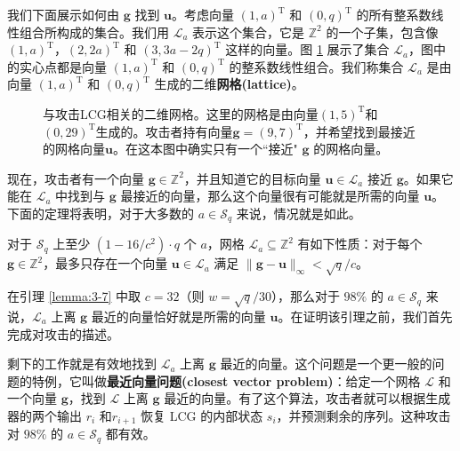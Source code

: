 \begin{snote}[密码分析。]
我们下面展示如何由 $\boldsymbol{g}$ 找到 $\boldsymbol{u}$。考虑向量 $(1,a)^\mathrm{T}$ 和 $(0,q)^\mathrm{T}$ 的所有整系数线性组合所构成的集合。我们用 $\mathcal{L}_a$ 表示这个集合，它是 $\mathbb{Z}^2$ 的一个子集，包含像 $(1,a)^\mathrm{T}$，$(2,2a)^\mathrm{T}$ 和 $(3,3a-2q)^\mathrm{T}$ 这样的向量。图 \ref{fig:3-9} 展示了集合 $\mathcal{L}_a$，图中的实心点都是向量 $(1,a)^\mathrm{T}$ 和 $(0,q)^\mathrm{T}$ 的整系数线性组合。我们称集合 $\mathcal{L}_a$ 是由向量 $(1,a)^\mathrm{T}$ 和 $(0,q)^\mathrm{T}$ 生成的二维\textbf{网格(lattice)}。

\begin{figure}
	\centering
	
	\caption{与攻击LCG相关的二维网格。这里的网格是由向量$(1,5)^\mathrm{T}$和$(0,29)^\mathrm{T}$生成的。攻击者持有向量$\boldsymbol{g}=(9,7)^\mathrm{T}$，并希望找到最接近的网格向量$\boldsymbol{u}$。在这本图中确实只有一个``接近" $\boldsymbol{g}$ 的网格向量。}
	\label{fig:3-9}
\end{figure}

现在，攻击者有一个向量 $\boldsymbol{g}\in\mathbb{Z}^2$，并且知道它的目标向量 $\boldsymbol{u}\in\mathcal{L}_a$ 接近 $\boldsymbol{g}$。如果它能在 $\mathcal{L}_a$ 中找到与 $\boldsymbol{g}$ 最接近的向量，那么这个向量很有可能就是所需的向量 $\boldsymbol{u}$。下面的定理将表明，对于大多数的 $a\in\mathcal{S}_q$ 来说，情况就是如此。
\end{snote}

\begin{lemma}\label{lemma:3-7}
对于 $\mathcal{S}_q$ 上至少 $(1-16/c^2)\cdot q$ 个 $a$，网格 $\mathcal{L}_a\subseteq\mathbb{Z}^2$ 有如下性质：对于每个 $\boldsymbol{g}\in\mathbb{Z}^2$，最多只存在一个向量 $\boldsymbol{u}\in\mathcal{L}_a$ 满足 $\lVert\boldsymbol{g}-\boldsymbol{u}\rVert_\infty < \sqrt{q}/c$。
\end{lemma}

在引理 \ref{lemma:3-7} 中取 $c=32$（则 $w=\sqrt{q}/30$），那么对于 $98\%$ 的 $a\in\mathcal{S}_q$ 来说，$\mathcal{L}_a$ 上离 $\boldsymbol{g}$ 最近的向量恰好就是所需的向量 $\boldsymbol{u}$。在证明该引理之前，我们首先完成对攻击的描述。

剩下的工作就是有效地找到 $\mathcal{L}_a$ 上离 $\boldsymbol{g}$ 最近的向量。这个问题是一个更一般的问题的特例，它叫做\textbf{最近向量问题(closest vector problem)}：给定一个网格 $\mathcal{L}$ 和一个向量 $\boldsymbol{g}$，找到 $\mathcal{L}$ 上离 $\boldsymbol{g}$ 最近的向量。有了这个算法，攻击者就可以根据生成器的两个输出 $r_i$ 和$r_{i+1}$ 恢复 LCG 的内部状态 $s_i$，并预测剩余的序列。这种攻击对 $98\%$ 的 $a\in\mathcal{S}_q$ 都有效。

